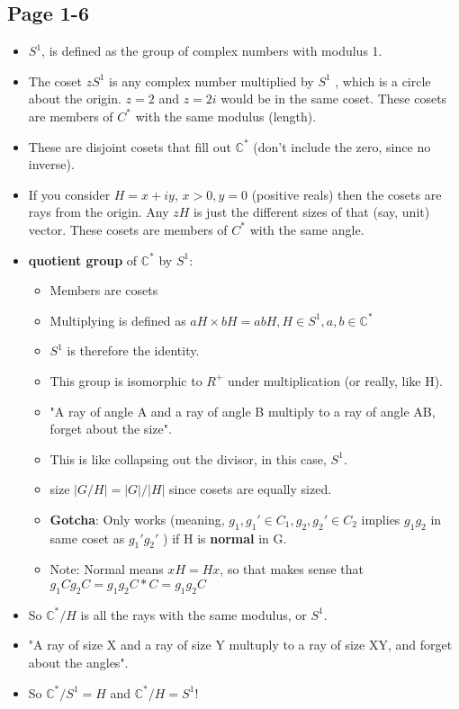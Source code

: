 \documentclass[11pt, oneside]{article}   	%
\begin{document}
\subsection{Page 1-6}
\begin{itemize}
\item $S^1$, is defined as the group of complex numbers with modulus 1.
\item The coset $zS^1$ is any complex number multiplied by $S^1$ , which is a circle about the origin.  $z=2$ and $z=2i$ would be in the same coset.  These cosets are members of $C^*$ with the same modulus (length).
\item These are disjoint cosets that fill out $\mathbb{C}^*$ (don't include the zero, since no inverse).
\item If you consider $H=x+iy$, $x > 0, y=0$ (positive reals) then the cosets are rays from the origin.  Any $zH$ is just the different sizes of that (say, unit) vector.  These cosets are members of $C^*$ with the same angle.
\item \textbf{quotient group} of $\mathbb{C}^*$ by $S^1$:
	\begin{itemize}
	\item Members are cosets
	\item Multiplying is defined as $aH \times bH = abH, H \in S^1, a,b \in \mathbb{C}^*$ 
	\item $S^1$ is therefore the identity.
	\item This group is isomorphic to $R^+$ under multiplication (or really, like H).
	\item "A ray of angle A and a ray of angle B multiply to a ray of angle AB, forget about the size".
	\item This is like collapsing out the divisor, in this case, $S^1$.
	\item size $|G / H| = |G| / |H|$ since cosets are equally sized.
	\item \textbf{Gotcha}: Only works (meaning, $g_1, g_1' \in C_1, g_2, g_2' \in C_2$ implies $g_1g_2$ in same coset as $g_1'g_2'$ ) if H is \textbf{normal} in G.  
	\item Note: Normal means $xH = Hx$, so that makes sense that $g_1Cg_2C = g_1g_2C*C=g_1g_2C$
	\end{itemize}
\item So $\mathbb{C}^* / H$ is all the rays with the same modulus, or $S^1$.  
\item	"A ray of size X and a ray of size Y multuply to a ray of size XY, and forget about the angles".
\item So $\mathbb{C}^* / S^1 = H$ and $\mathbb{C}^* / H = S^1$!
\end{itemize}
\end{document}
